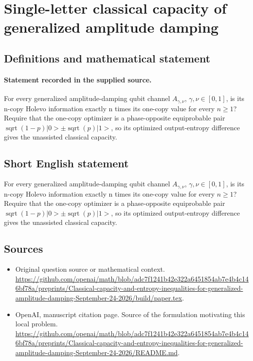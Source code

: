 \documentclass[11pt]{article}
\begin{document}
\section*{Single-letter classical capacity of generalized amplitude damping}\label{30007208}
\subsection{Definitions and mathematical statement}
\paragraph{Statement recorded in the supplied source.}
For every generalized amplitude-damping qubit channel $A_{\gamma ,\nu }$, $\gamma ,\nu \in [0,1]$, is its n-copy Holevo information exactly n times its one-copy value for every $n\geq 1$? Require that the one-copy optimizer is a phase-opposite equiprobable pair $\operatorname{sqrt}(1-p)|0>\pm \operatorname{sqrt}(p)|1>$, so its optimized output-entropy difference gives the unassisted classical capacity.
\subsection{Short English statement}
For every generalized amplitude-damping qubit channel $A_{\gamma ,\nu }$, $\gamma ,\nu \in [0,1]$, is its n-copy Holevo information exactly n times its one-copy value for every $n\geq 1$? Require that the one-copy optimizer is a phase-opposite equiprobable pair $\operatorname{sqrt}(1-p)|0>\pm \operatorname{sqrt}(p)|1>$, so its optimized output-entropy difference gives the unassisted classical capacity.
\subsection{Sources}
\begin{itemize}
\item[S1] Original question source or mathematical context.
\url{https://github.com/openai/math/blob/adc7f1241b42e322a6451854ab7e4b4c146bf78a/preprints/Classical-capacity-and-entropy-inequalities-for-generalized-amplitude-damping-September-24-2026/build/paper.tex}.
\item[S2] OpenAI, manuscript citation page. Source of the formulation motivating this local problem.
\url{https://github.com/openai/math/blob/adc7f1241b42e322a6451854ab7e4b4c146bf78a/preprints/Classical-capacity-and-entropy-inequalities-for-generalized-amplitude-damping-September-24-2026/README.md}.
\end{itemize}
\end{document}
